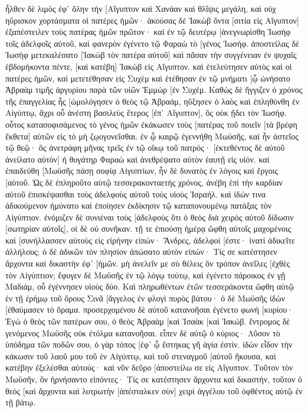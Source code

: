 ἦλθεν δὲ λιμὸς ἐφ᾽ ὅλην τὴν [Αἴγυπτον καὶ Χανάαν καὶ θλῖψις μεγάλη, καὶ οὐχ ηὕρισκον χορτάσματα οἱ πατέρες ἡμῶν· 
ἀκούσας δὲ Ἰακὼβ ὄντα [σιτία εἰς Αἴγυπτον] ἐξαπέστειλεν τοὺς πατέρας ἡμῶν πρῶτον· 
καὶ ἐν τῷ δευτέρῳ [ἀνεγνωρίσθη Ἰωσὴφ τοῖς ἀδελφοῖς αὐτοῦ, καὶ φανερὸν ἐγένετο τῷ Φαραὼ τὸ [γένος Ἰωσήφ. 
ἀποστείλας δὲ Ἰωσὴφ μετεκαλέσατο [Ἰακὼβ τὸν πατέρα αὐτοῦ] καὶ πᾶσαν τὴν συγγένειαν ἐν ψυχαῖς ἑβδομήκοντα πέντε, 
[καὶ κατέβη] Ἰακὼβ εἰς Αἴγυπτον. καὶ ἐτελεύτησεν αὐτὸς καὶ οἱ πατέρες ἡμῶν, 
καὶ μετετέθησαν εἰς Συχὲμ καὶ ἐτέθησαν ἐν τῷ μνήματι [ᾧ ὠνήσατο Ἀβραὰμ τιμῆς ἀργυρίου παρὰ τῶν υἱῶν Ἑμμὼρ [ἐν Συχέμ. 
Καθὼς δὲ ἤγγιζεν ὁ χρόνος τῆς ἐπαγγελίας ἧς [ὡμολόγησεν ὁ θεὸς τῷ Ἀβραάμ, ηὔξησεν ὁ λαὸς καὶ ἐπληθύνθη ἐν Αἰγύπτῳ, 
ἄχρι οὗ ἀνέστη βασιλεὺς ἕτερος [ἐπ᾽ Αἴγυπτον], ὃς οὐκ ᾔδει τὸν Ἰωσήφ. 
οὗτος κατασοφισάμενος τὸ γένος ἡμῶν ἐκάκωσεν τοὺς [πατέρας τοῦ ποιεῖν [τὰ βρέφη ἔκθετα] αὐτῶν εἰς τὸ μὴ ζῳογονεῖσθαι. 
ἐν ᾧ καιρῷ ἐγεννήθη Μωϋσῆς, καὶ ἦν ἀστεῖος τῷ θεῷ· ὃς ἀνετράφη μῆνας τρεῖς ἐν τῷ οἴκῳ τοῦ πατρός· 
[ἐκτεθέντος δὲ αὐτοῦ ἀνείλατο αὐτὸν] ἡ θυγάτηρ Φαραὼ καὶ ἀνεθρέψατο αὐτὸν ἑαυτῇ εἰς υἱόν. 
καὶ ἐπαιδεύθη [Μωϋσῆς πάσῃ σοφίᾳ Αἰγυπτίων, ἦν δὲ δυνατὸς ἐν λόγοις καὶ ἔργοις [αὐτοῦ. 
Ὡς δὲ ἐπληροῦτο αὐτῷ τεσσερακονταετὴς χρόνος, ἀνέβη ἐπὶ τὴν καρδίαν αὐτοῦ ἐπισκέψασθαι τοὺς ἀδελφοὺς αὐτοῦ τοὺς υἱοὺς Ἰσραήλ. 
καὶ ἰδών τινα ἀδικούμενον ἠμύνατο καὶ ἐποίησεν ἐκδίκησιν τῷ καταπονουμένῳ πατάξας τὸν Αἰγύπτιον. 
ἐνόμιζεν δὲ συνιέναι τοὺς [ἀδελφοὺς ὅτι ὁ θεὸς διὰ χειρὸς αὐτοῦ δίδωσιν [σωτηρίαν αὐτοῖς], οἱ δὲ οὐ συνῆκαν. 
τῇ τε ἐπιούσῃ ἡμέρᾳ ὤφθη αὐτοῖς μαχομένοις καὶ [συνήλλασσεν αὐτοὺς εἰς εἰρήνην εἰπών· Ἄνδρες, ἀδελφοί [ἐστε· ἱνατί ἀδικεῖτε ἀλλήλους; 
ὁ δὲ ἀδικῶν τὸν πλησίον ἀπώσατο αὐτὸν εἰπών· Τίς σε κατέστησεν ἄρχοντα καὶ δικαστὴν ἐφ᾽ [ἡμῶν. 
μὴ ἀνελεῖν με σὺ θέλεις ὃν τρόπον ἀνεῖλες [ἐχθὲς τὸν Αἰγύπτιον; 
ἔφυγεν δὲ Μωϋσῆς ἐν τῷ λόγῳ τούτῳ, καὶ ἐγένετο πάροικος ἐν γῇ Μαδιάμ, οὗ ἐγέννησεν υἱοὺς δύο. 
Καὶ πληρωθέντων ἐτῶν τεσσεράκοντα ὤφθη αὐτῷ ἐν τῇ ἐρήμῳ τοῦ ὄρους Σινᾶ [ἄγγελος ἐν φλογὶ πυρὸς βάτου· 
ὁ δὲ Μωϋσῆς ἰδὼν [ἐθαύμασεν τὸ ὅραμα. προσερχομένου δὲ αὐτοῦ κατανοῆσαι ἐγένετο φωνὴ [κυρίου· 
Ἐγὼ ὁ θεὸς τῶν πατέρων σου, ὁ θεὸς Ἀβραὰμ [καὶ Ἰσαὰκ [καὶ Ἰακώβ. ἔντρομος δὲ γενόμενος Μωϋσῆς οὐκ ἐτόλμα κατανοῆσαι. 
εἶπεν δὲ αὐτῷ ὁ κύριος· Λῦσον τὸ ὑπόδημα τῶν ποδῶν σου, ὁ γὰρ τόπος [ἐφ᾽ ᾧ ἕστηκας γῆ ἁγία ἐστίν. 
ἰδὼν εἶδον τὴν κάκωσιν τοῦ λαοῦ μου τοῦ ἐν Αἰγύπτῳ, καὶ τοῦ στεναγμοῦ [αὐτοῦ ἤκουσα, καὶ κατέβην ἐξελέσθαι αὐτούς· καὶ νῦν δεῦρο [ἀποστείλω σε εἰς Αἴγυπτον. 
Τοῦτον τὸν Μωϋσῆν, ὃν ἠρνήσαντο εἰπόντες· Τίς σε κατέστησεν ἄρχοντα καὶ δικαστήν, τοῦτον ὁ θεὸς [καὶ ἄρχοντα καὶ λυτρωτὴν [ἀπέσταλκεν σὺν] χειρὶ ἀγγέλου τοῦ ὀφθέντος αὐτῷ ἐν τῇ βάτῳ. 
